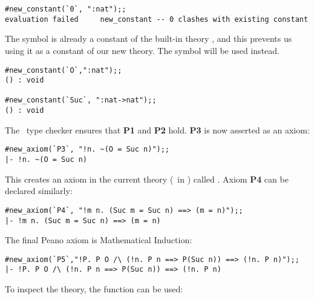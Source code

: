 \begin{session}\begin{verbatim}
#new_constant(`0`, ":nat");;
evaluation failed     new_constant -- 0 clashes with existing constant
\end{verbatim}\end{session}


The symbol 
is already a constant of the built-in theory , and this prevents
us using it as a constant of our new theory. The symbol  will be used
instead.

\begin{session}\begin{verbatim}
#new_constant(`O`,":nat");;
() : void

#new_constant(`Suc`, ":nat->nat");;
() : void
\end{verbatim}\end{session}



The \HOL\ type checker ensures that {\small\bf P1} and {\small\bf P2} hold.
{\small\bf P3} is now asserted as an axiom:

\begin{session}\begin{verbatim}
#new_axiom(`P3`, "!n. ~(O = Suc n)");;
|- !n. ~(O = Suc n)
\end{verbatim}\end{session}

\noindent This creates an axiom in the current theory (\ie\ in ) called
. Axiom {\small\bf P4} can be declared similarly:


\begin{session}\begin{verbatim}
#new_axiom(`P4`, "!m n. (Suc m = Suc n) ==> (m = n)");;
|- !m n. (Suc m = Suc n) ==> (m = n)
\end{verbatim}\end{session}

The final Peano axiom is Mathematical Induction:

\begin{session}\begin{verbatim}
#new_axiom(`P5`,"!P. P O /\ (!n. P n ==> P(Suc n)) ==> (!n. P n)");;
|- !P. P O /\ (!n. P n ==> P(Suc n)) ==> (!n. P n)
\end{verbatim}\end{session}

To inspect the theory, the function  can be used:

